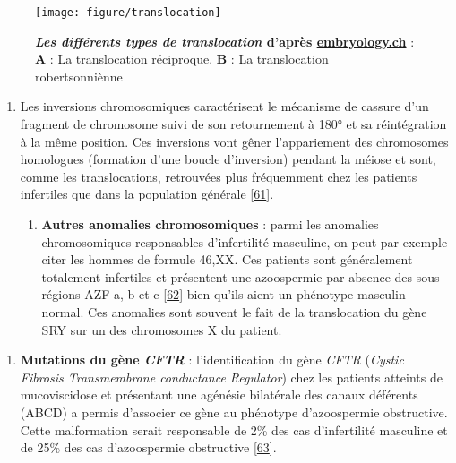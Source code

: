 \documentclass[12pt,a4paper,twoside]{ugathesis}
\providecommand{\tightlist}{%
  \setlength{\itemsep}{0pt}\setlength{\parskip}{0pt}}
\theoremstyle{definition}
\theoremstyle{definition}
\theoremstyle{definition}
\theoremstyle{remark}
\begin{document}
\begin{figure}

{\centering \texttt{[image: figure/translocation]} 

}

\caption[Les différents types de translocation]{\textbf{\emph{Les différents types de
translocation} d'après
\href{http://www.embryology.ch/francais/kchromaber/abweichende03.html}{embryology.ch}}
: \textbf{A} : La translocation réciproque. \textbf{B} : La
translocation robertsonniènne}\label{fig:figtranslocation}
\end{figure}

\begin{enumerate}
\def\labelenumi{\roman{enumi}.}
\setcounter{enumi}{1}
\item
  Les inversions chromosomiques caractérisent le mécanisme de cassure
  d'un fragment de chromosome suivi de son retournement à 180° et sa
  réintégration à la même position. Ces inversions vont gêner
  l'appariement des chromosomes homologues (formation d'une boucle
  d'inversion) pendant la méiose et sont, comme les translocations,
  retrouvées plus fréquemment chez les patients infertiles que dans la
  population générale {[}\protect\hyperlink{ref-Krausz2000}{61}{]}.

  \begin{enumerate}
  \def\labelenumii{\alph{enumii}.}
  \setcounter{enumii}{2}
  \tightlist
  \item
    \textbf{Autres anomalies chromosomiques} : parmi les anomalies
    chromosomiques responsables d'infertilité masculine, on peut par
    exemple citer les hommes de formule 46,XX. Ces patients sont
    généralement totalement infertiles et présentent une azoospermie par
    absence des sous- régions AZF a, b et c
    {[}\protect\hyperlink{ref-Vorona2007}{62}{]} bien qu'ils aient un
    phénotype masculin normal. Ces anomalies sont souvent le fait de la
    translocation du gène SRY sur un des chromosomes X du patient.
  \end{enumerate}
\end{enumerate}

\begin{enumerate}
\def\labelenumi{\arabic{enumi}.}
\setcounter{enumi}{2}
\tightlist
\item
  \textbf{Mutations du gène \emph{CFTR} }: l'identification du gène
  \emph{CFTR} (\emph{Cystic Fibrosis Transmembrane conductance
  Regulator}) chez les patients atteints de mucoviscidose et présentant
  une agénésie bilatérale des canaux déférents (ABCD) a permis
  d'associer ce gène au phénotype d'azoospermie obstructive. Cette
  malformation serait responsable de 2\% des cas d'infertilité masculine
  et de 25\% des cas d'azoospermie obstructive
  {[}\protect\hyperlink{ref-Yu2012}{63}{]}.
\end{enumerate}
\end{document}
